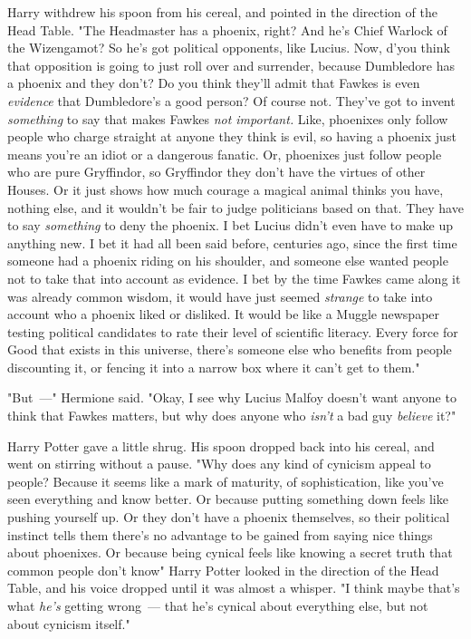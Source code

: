Harry withdrew his spoon from his cereal, and pointed in the direction of the
Head Table. "The Headmaster has a phoenix, right? And he's Chief Warlock of the
Wizengamot? So he's got political opponents, like Lucius. Now, d'you think that
opposition is going to just roll over and surrender, because Dumbledore has a
phoenix and they don't? Do you think they'll admit that Fawkes is even
\emph{evidence} that Dumbledore's a good person? Of course not. They've got to
invent \emph{something} to say that makes Fawkes{\el} \emph{not important.}
Like, phoenixes only follow people who charge straight at anyone they think is
evil, so having a phoenix just means you're an idiot or a dangerous fanatic.
Or, phoenixes just follow people who are pure Gryffindor, so Gryffindor they
don't have the virtues of other Houses. Or it just shows how much courage a
magical animal thinks you have, nothing else, and it wouldn't be fair to judge
politicians based on that. They have to say \emph{something} to deny the
phoenix. I bet Lucius didn't even have to make up anything new. I bet it had
all been said before, centuries ago, since the first time someone had a phoenix
riding on his shoulder, and someone else wanted people not to take that into
account as evidence. I bet by the time Fawkes came along it was already common
wisdom, it would have just seemed \emph{strange} to take into account who a
phoenix liked or disliked. It would be like a Muggle newspaper testing
political candidates to rate their level of scientific literacy. Every force
for Good that exists in this universe, there's someone else who benefits from
people discounting it, or fencing it into a narrow box where it can't get to
them."

"But~---" Hermione said. "Okay, I see why Lucius Malfoy doesn't want anyone to
think that Fawkes matters, but why does anyone who \emph{isn't} a bad guy
\emph{believe} it?"

Harry Potter gave a little shrug. His spoon dropped back into his cereal, and
went on stirring without a pause. "Why does any kind of cynicism appeal to
people? Because it seems like a mark of maturity, of sophistication, like
you've seen everything and know better. Or because putting something down feels
like pushing yourself up. Or they don't have a phoenix themselves, so their
political instinct tells them there's no advantage to be gained from saying
nice things about phoenixes. Or because being cynical feels like knowing a
secret truth that common people don't know{\el}" Harry Potter looked in the
direction of the Head Table, and his voice dropped until it was almost a
whisper. "I think maybe that's what \emph{he's} getting wrong~--- that he's
cynical about everything else, but not about cynicism itself."

